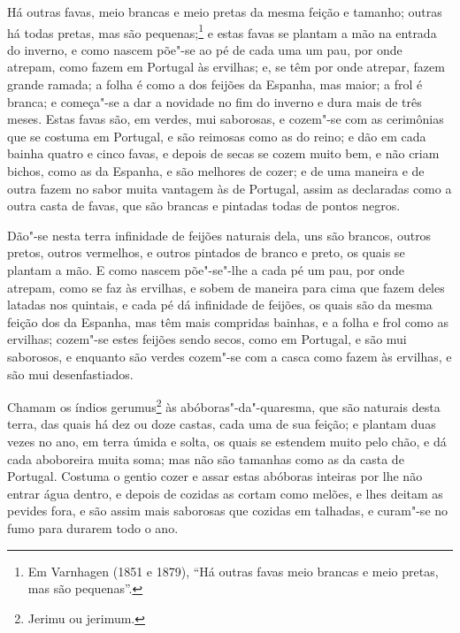 Há outras favas, meio brancas e meio pretas da mesma feição e tamanho; outras há todas
pretas, mas são pequenas;\footnote{ Em Varnhagen (1851 e 1879), ``Há outras favas meio
brancas e meio pretas, mas são pequenas''.} e estas favas se plantam a mão na entrada do
inverno, e como nascem põe"-se ao pé de cada uma um pau, por onde atrepam, como fazem em
Portugal às ervilhas; e, se têm por onde atrepar, fazem grande ramada; a folha é como a
dos feijões da Espanha, mas maior; a frol é branca; e começa"-se a dar a novidade no fim do
inverno e dura mais de três meses. Estas favas são, em verdes, mui saborosas, e cozem"-se
com as cerimônias que se costuma em Portugal, e são reimosas como as do reino; e dão em
cada bainha quatro e cinco favas, e depois de secas se cozem muito bem, e não criam
bichos, como as da Espanha, e são melhores de cozer; e de uma maneira e de outra fazem no
sabor muita vantagem às de Portugal, assim as declaradas como a outra casta de favas, que
são brancas e pintadas todas de pontos negros.

Dão"-se nesta terra infinidade de feijões naturais dela, uns são brancos, outros pretos,
outros vermelhos, e outros pintados de branco e preto, os quais se plantam a mão. E como
nascem põe"-se"-lhe a cada pé um pau, por onde atrepam, como se faz às ervilhas, e sobem de
maneira para cima que fazem deles latadas nos quintais, e cada pé dá infinidade de
feijões, os quais são da mesma feição dos da Espanha, mas têm mais compridas bainhas, e a
folha e frol como as ervilhas; cozem"-se estes feijões sendo secos, como em Portugal, e são
mui saborosos, e enquanto são verdes cozem"-se com a casca como fazem às ervilhas, e são
mui desenfastiados.

Chamam os índios gerumus\footnote{ Jerimu ou jerimum.} às abóboras"-da"-quaresma, que são
naturais desta terra, das quais há dez ou doze castas, cada uma de sua feição; e plantam
duas vezes no ano, em terra úmida e solta, os quais se estendem muito pelo chão, e dá cada
aboboreira muita soma; mas não são tamanhas como as da casta de Portugal. Costuma o gentio
cozer e assar estas abóboras inteiras por lhe não entrar água dentro, e depois de cozidas
as cortam como melões, e lhes deitam as pevides fora, e são assim mais saborosas que
cozidas em talhadas, e curam"-se no fumo para durarem todo o ano.

